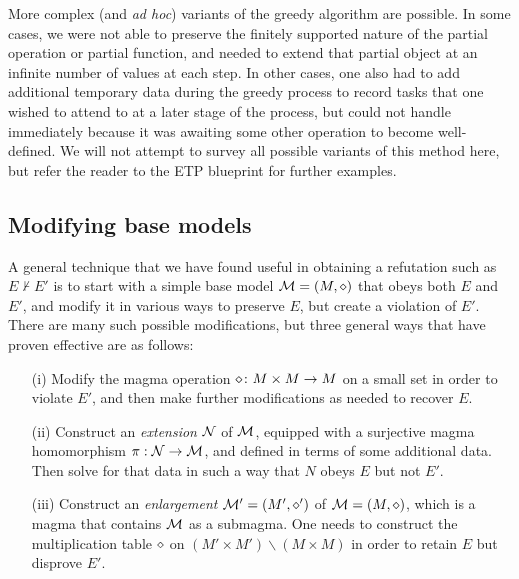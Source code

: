 More complex (and \emph{ad hoc}) variants of the greedy algorithm are possible.  In some cases, we were not able to preserve the finitely supported nature of the partial operation or partial function, and needed to extend that partial object at an infinite number of values at each step.  In other cases, one also had to add additional temporary data during the greedy process to record tasks that one wished to attend to at a later stage of the process, but could not handle immediately because it was awaiting some other operation to become well-defined.  We will not attempt to survey all possible variants of this method here, but refer the reader to the ETP blueprint for further examples.

\subsection{Modifying base models}\label{modify-base}

A general technique that we have found useful in obtaining a refutation such as $E \not \vdash E'$ is to start with a simple base model ${\mathcal{M}} = (M,\diamond)$ that obeys both $E$ and $E'$, and modify it in various ways to preserve $E$, but create a violation of $E'$.  There are many such possible modifications, but three general ways that have proven effective are as follows:

\begin{itemize}
  \item[(i)]  Modify the magma operation $\diamond \colon M \times M \to M$ on a small set in order to violate $E'$, and then make further modifications as needed to recover $E$.
  \item[(ii)]  Construct an \emph{extension} ${\mathcal{N}}$ of ${\mathcal{M}}$, equipped with a surjective magma homomorphism $\pi: {\mathcal{N}} \to {\mathcal{M}}$, and defined in terms of some additional data.  Then solve for that data in such a way that $N$ obeys $E$ but not $E'$.
  \item[(iii)]  Construct an \emph{enlargement} ${\mathcal{M}}' = (M',\diamond')$ of ${\mathcal{M}} = (M,\diamond)$, which is a magma that contains ${\mathcal{M}}$ as a submagma.  One needs to construct the multiplication table $\diamond$ on $(M' \times M') \backslash (M \times M)$ in order to retain $E$ but disprove $E'$.
\end{itemize}

